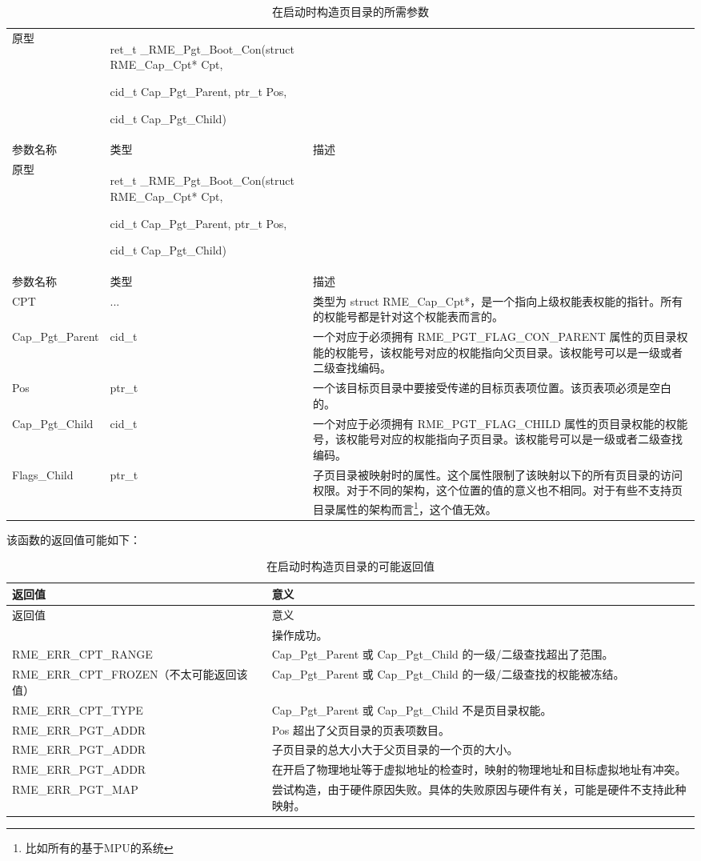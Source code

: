 \begin{xltabular}{\textwidth}{@{}>{\hsize\raggedright\arraybackslash}X>{\hsize\raggedright\arraybackslash}X>{\hsize\raggedright\arraybackslash}X@{}}
\caption{在启动时构造页目录的所需参数}\label{tab:7-47-construct-page-directory-at-boot-parameters}\\
\toprule
原型\strut
 & ret\_t \_RME\_Pgt\_Boot\_Con(struct RME\_Cap\_Cpt* Cpt,

cid\_t Cap\_Pgt\_Parent, ptr\_t Pos,

cid\_t Cap\_Pgt\_Child)\strut
 & \strut
\tabularnewline
参数名称 & 类型 & 描述\tabularnewline
\endfirsthead
\toprule
原型\strut
 & ret\_t \_RME\_Pgt\_Boot\_Con(struct RME\_Cap\_Cpt* Cpt,

cid\_t Cap\_Pgt\_Parent, ptr\_t Pos,

cid\_t Cap\_Pgt\_Child)\strut
 & \strut
\tabularnewline
参数名称 & 类型 & 描述\tabularnewline
\midrule
\endhead
\bottomrule
\endlastfoot
CPT & ... &
类型为 struct RME\_Cap\_Cpt*，是一个指向上级权能表权能的指针。所有的权能号都是针对这个权能表而言的。\tabularnewline
Cap\_Pgt\_Parent & cid\_t &
一个对应于必须拥有 RME\_PGT\_FLAG\_CON\_PARENT 属性的页目录权能的权能号，该权能号对应的权能指向父页目录。该权能号可以是一级或者二级查找编码。\tabularnewline
Pos & ptr\_t &
一个该目标页目录中要接受传递的目标页表项位置。该页表项必须是空白的。\tabularnewline
Cap\_Pgt\_Child & cid\_t &
一个对应于必须拥有 RME\_PGT\_FLAG\_CHILD 属性的页目录权能的权能号，该权能号对应的权能指向子页目录。该权能号可以是一级或者二级查找编码。\tabularnewline
Flags\_Child & ptr\_t &
子页目录被映射时的属性。这个属性限制了该映射以下的所有页目录的访问权限。对于不同的架构，这个位置的值的意义也不相同。对于有些不支持页目录属性的架构而言\footnote{比如所有的基于MPU的系统}，这个值无效。\tabularnewline
\end{xltabular}

该函数的返回值可能如下：

\begin{xltabular}{\textwidth}{@{}>{\hsize\raggedright\arraybackslash}X>{\hsize\raggedright\arraybackslash}X@{}}
\caption{在启动时构造页目录的可能返回值}\label{tab:7-48-construct-page-directory-at-boot-return-values}\\
\toprule
返回值 & 意义\tabularnewline
\endfirsthead
\toprule
返回值 & 意义\tabularnewline
\midrule
\endhead
\bottomrule
{} & 操作成功。\tabularnewline
    RME\_ERR\_CPT\_RANGE & Cap\_Pgt\_Parent 或 Cap\_Pgt\_Child 的一级/二级查找超出了范围。\tabularnewline
    RME\_ERR\_CPT\_FROZEN（不太可能返回该值） & Cap\_Pgt\_Parent 或 Cap\_Pgt\_Child 的一级/二级查找的权能被冻结。\tabularnewline
    RME\_ERR\_CPT\_TYPE & Cap\_Pgt\_Parent 或 Cap\_Pgt\_Child 不是页目录权能。\tabularnewline
    RME\_ERR\_PGT\_ADDR & Pos 超出了父页目录的页表项数目。\tabularnewline
    RME\_ERR\_PGT\_ADDR & 子页目录的总大小大于父页目录的一个页的大小。\tabularnewline
    RME\_ERR\_PGT\_ADDR & 在开启了物理地址等于虚拟地址的检查时，映射的物理地址和目标虚拟地址有冲突。\tabularnewline
    RME\_ERR\_PGT\_MAP & 尝试构造，由于硬件原因失败。具体的失败原因与硬件有关，可能是硬件不支持此种映射。\tabularnewline
\end{xltabular}

